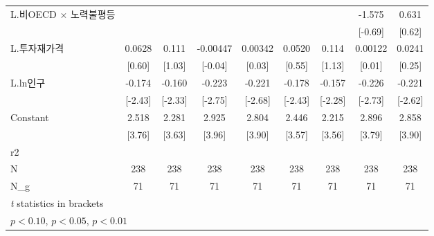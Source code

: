 \begin{table}[htbp]
{\begin{tabular}{l*{8}{c}}
\addlinespace
L.비OECD $\times$ 노력불평등&                     &                     &                     &                     &                     &                     &      -1.575         &       0.631         \\
                    &                     &                     &                     &                     &                     &                     &     [-0.69]         &      [0.62]         \\
\addlinespace
L.투자재가격        &      0.0628         &       0.111         &    -0.00447         &     0.00342         &      0.0520         &       0.114         &     0.00122         &      0.0241         \\
                    &      [0.60]         &      [1.03]         &     [-0.04]         &      [0.03]         &      [0.55]         &      [1.13]         &      [0.01]         &      [0.25]         \\
\addlinespace
L.ln인구            &      -0.174\sym{**} &      -0.160\sym{**} &      -0.223\sym{***}&      -0.221\sym{***}&      -0.178\sym{**} &      -0.157\sym{**} &      -0.226\sym{***}&      -0.221\sym{***}\\
                    &     [-2.43]         &     [-2.33]         &     [-2.75]         &     [-2.68]         &     [-2.43]         &     [-2.28]         &     [-2.73]         &     [-2.62]         \\
\addlinespace
Constant            &       2.518\sym{***}&       2.281\sym{***}&       2.925\sym{***}&       2.804\sym{***}&       2.446\sym{***}&       2.215\sym{***}&       2.896\sym{***}&       2.858\sym{***}\\
                    &      [3.76]         &      [3.63]         &      [3.96]         &      [3.90]         &      [3.57]         &      [3.56]         &      [3.79]         &      [3.90]         \\
\midrule
r2                  &                     &                     &                     &                     &                     &                     &                     &                     \\
N                   &         238         &         238         &         238         &         238         &         238         &         238         &         238         &         238         \\
N\_g                 &          71         &          71         &          71         &          71         &          71         &          71         &          71         &          71         \\
\bottomrule
\multicolumn{9}{l}{\footnotesize \textit{t} statistics in brackets}\\
\multicolumn{9}{l}{\footnotesize \sym{*} \(p<0.10\), \sym{**} \(p<0.05\), \sym{***} \(p<0.01\)}\\
\end{tabular}}
\end{table}
